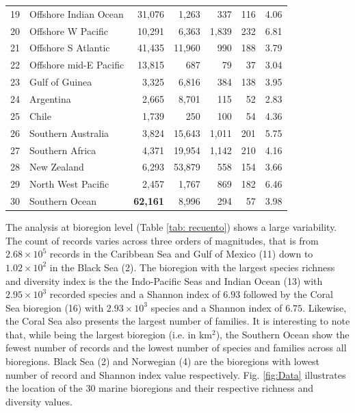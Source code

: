 \documentclass[12pt,authoryear]{elsarticle}
\providecommand{\DIFaddendFL}{} %
\begin{document}
\begin{table}[]
{\begin{tabular}{ c | l  r  r  r  r  r }
  19 & Offshore Indian Ocean               &  31,076 &   1,263 &   337 & 116 & 4.06 \\ 
  20 & Offshore W Pacific                  &  10,291 &   6,363 & 1,839 & 232 & 6.81 \\ 
  21 & Offshore S Atlantic                 &  41,435 &  11,960 &   990 & 188 & 3.79 \\ 
  22 & Offshore mid-E Pacific              &  13,815 &     687 &    79 & 37  & 3.04 \\ 
  23 & Gulf of Guinea                      &   3,325 &   6,816 &   384 & 138 & 3.95 \\ 
  24 & Argentina                           &   2,665 &   8,701 &   115 & 52  & 2.83 \\ 
  25 & Chile                               &   1,739 &     250 &   100 & 54  & 4.36 \\ 
  26 & Southern Australia                  &   3,824 &  15,643 & 1,011 & 201 & 5.75 \\ 
  27 & Southern Africa                     &   4,371 &  19,954 & 1,142 & 210 & 4.16 \\ 
  28 & New Zealand                         &   6,293 &  53,879 &   558 & 154 & 3.66 \\ 
  29 & North West Pacific                  &   2,457 &   1,767 &   869 & 182 & 6.46 \\ 
  30 & Southern Ocean                      &  \textbf{62,161} & 8,996 & 294 & 57 & 3.98 \\
\hline
\hline

\end{tabular}
}
\DIFaddendFL \end{table}

The analysis at bioregion level (Table \ref{tab: recuento}) shows a large variability. The count of records varies across three orders of magnitudes, that is from $2.68\times 10^5$ records in the Caribbean Sea and Gulf of Mexico (11) down to $1.02 \times 10^2$ in the Black Sea (2). The bioregion with the largest species richness and diversity index is the the Indo-Pacific Seas and Indian Ocean (13) with $2.95 \times 10^3$ recorded species and a Shannon index of $6.93$ followed by the Coral Sea bioregion (16) with $2.93 \times 10^3$ species and a Shannon index of $6.75$. Likewise, the Coral Sea also presents the largest number of families. It is interesting to note that, while being the largest bioregion (i.e. in km$^2$), the Southern Ocean show the fewest number of records and the lowest number of species and families across all bioregions. Black Sea (2) and Norwegian (4) are the bioregions with lowest number of record and Shannon index value respectively. Fig. \ref{fig:Data} illustrates the location of the 30 marine bioregions and their respective richness and diversity values.
\end{document}
